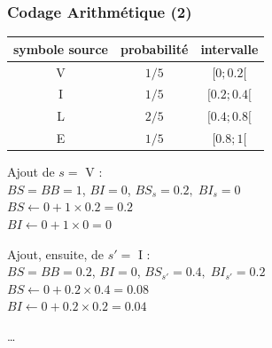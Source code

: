 \documentclass{beamer}
\begin{document}
\begin{frame}
    \frametitle{Codage Arithmétique (2)}

    {
    \centering
    \begin{tabular}{c | c | c}
        symbole source & probabilité & intervalle  \\
        \hline
        V & $1/5$ & $[0; 0.2[$ \\ 
        I & $1/5$ & $[0.2; 0.4[$\\
        L & $2/5$ & $[0.4; 0.8[$\\
        E & $1/5$ & $[0.8; 1[$\\ \hline
    \end{tabular}\par
    }
    
    \vspace*{1em}

    Ajout de $s = $ V : \\
    $BS = BB = 1$, $BI = 0$, $BS_s = 0.2,\; BI_s = 0$ \\
    $BS \leftarrow 0 + 1 \times 0.2 = 0.2$ \\
    $BI \leftarrow 0 + 1 \times 0 = 0$ \\

    \vspace*{1em}

    Ajout, ensuite, de $s'=$ I : \\
    $BS = BB = 0.2$, $BI = 0$, $BS_{s'} = 0.4, \; BI_{s'} = 0.2$ \\
    $BS \leftarrow 0 + 0.2 \times 0.4 = 0.08$ \\
    $BI \leftarrow 0 + 0.2 \times 0.2 = 0.04$ \\

    \vspace*{0.5em}

    \dots
\end{frame}
\end{document}
